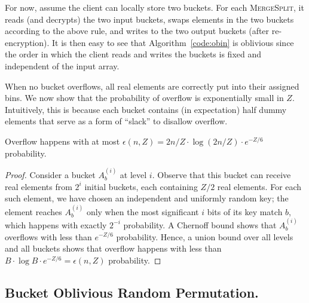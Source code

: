 For now, assume the client can locally store two buckets.
For each \textsc{MergeSplit}, it reads (and decrypts) the two input buckets, swaps elements in the two buckets according to the above rule, and writes to the two output buckets (after re-encryption).
It is then easy to see that Algorithm~\ref{code:obin} is oblivious since the order in which the client reads and writes the buckets is fixed and independent of the input array.

When no bucket overflows, all real elements are correctly put into their assigned bins.
We now show that the probability of overflow is exponentially small in $Z$. 
Intuitively, this is because each bucket contains (in expectation) half dummy elements that serve as a form of ``slack'' to disallow overflow.

\begin{lemma}
\label{lemma:shuffle}
Overflow happens with at most $\epsilon(n, Z) = 2n/Z \cdot \log(2n/Z) \cdot e^{-Z/6}$ probability.
\end{lemma}
\begin{proof}
\label{clm:proof-shuffle}
Consider a bucket $A^{(i)}_b$ at level $i$.
Observe that this bucket can receive real elements from $2^i$ initial buckets, each containing $Z/2$ real elements.
For each such element, we have chosen an independent and uniformly random key;
the element reaches $A^{(i)}_b$ only when the most significant $i$ bits of its key match $b$,
which happens with exactly $2^{-i}$ probability.
A Chernoff bound shows that $A^{(i)}_b$ overflows with less than $e^{-Z/6}$ probability.
Hence, a union bound over all levels and all buckets 
shows that overflow happens with less than $B \cdot \log B \cdot e^{-Z/6} = \epsilon(n,Z)$ probability.
\end{proof}


\subsection{Bucket Oblivious Random Permutation.}
\label{sec:ORP}

